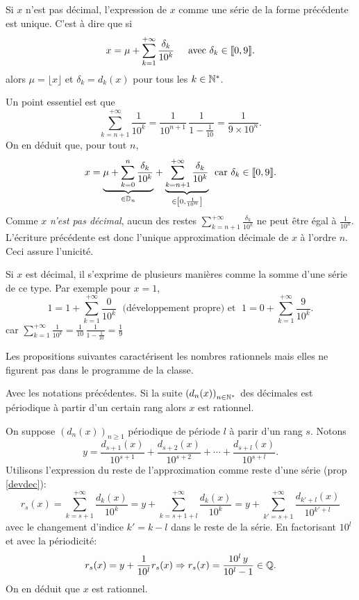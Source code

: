 \begin{propn}
 Si $x$ n'est pas décimal, l'expression de $x$ comme une série de la forme précédente est unique. C'est à dire que si
\[
 x = \mu + \sum_{k=1}^{+\infty} \frac{\delta_k}{10^k} \hspace{0.5cm} \text{avec } \delta_k \in \llbracket 0,9 \rrbracket.
\]
alors $\mu = \lfloor x \rfloor$ et $\delta_k = d_k(x)$ pour tous les $k \in \mathbb{N}^*$.
\end{propn}
\begin{demo}
Un point essentiel est que 
\[
\sum_{k=n+1}^{+\infty}\frac{1}{10^k} = \frac{1}{10^{n+1}}\,\frac{1}{1-\frac{1}{10}} = \frac{1}{9\times 10^n}.
\]
On en déduit que, pour tout $n$,
\[
 x = \underset{ \in \mathbb{D}_n}{\underbrace{\mu + \sum_{k=0}^{n}\frac{\delta_k}{10^k}}} 
 + \underset{ \in \left[ 0,\frac{1}{10^{n}}\right] }{\underbrace{\sum_{k=n+1}^{+\infty}\frac{\delta_k}{10^k}}}\; \text{ car } \delta_k \in \llbracket 0,9\rrbracket.
\]
Comme $x$ \emph{n'est pas décimal}, aucun des restes $\sum_{k=n+1}^{+\infty}\frac{\delta_k}{10^k}$ ne peut être égal à $\frac{1}{10^n}$. L'écriture précédente est donc l'unique approximation décimale de $x$ à l'ordre $n$. Ceci assure l'unicité.
\end{demo}
\begin{rem}
 Si $x$ est décimal, il s'exprime de plusieurs manières comme la somme d'une série de ce type. Par exemple pour $x=1$,
\[
 1 = 1 + \sum_{k=1}^{+\infty} \frac{0}{10^{k}} \;\text{ (développement propre) et } \; 1 = 0 + \sum_{k=1}^{+\infty} \frac{9}{10^{k}}.
\]
car $\sum_{k=1}^{+\infty} \frac{1}{10^{k}} = \frac{1}{10}\,\frac{1}{1 - \frac{1}{10}} = \frac{1}{9}$
\end{rem}
Les propositions suivantes caractérisent les nombres rationnels mais elles ne figurent pas dans le programme de la classe.
\begin{propn}
 Avec les notations précédentes. Si la suite $\left( d_n(x) \right)_{n \in \mathbb{N}^*}$ des décimales est périodique à partir d'un certain rang alors $x$ est rationnel. 
\end{propn}
\begin{demo}
 On suppose $\left( d_n(x) \right)_{n \geq 1}$ périodique de période $l$ à parir d'un rang $s$. Notons
\[
 y = \frac{d_{s+1}(x)}{10^{s+1}} + \frac{d_{s+2}(x)}{10^{s+2}} + \cdots + \frac{d_{s+l}(x)}{10^{s+l}}.  
\]
Utilisons l'expression du reste de l'approximation comme reste d'une série (prop \ref{devdec}):
\[
 r_{s}(x) = \sum_{k=s+1}^{+\infty}\frac{d_k(x)}{10^k}
 = y + \sum_{k=s+1+l}^{+\infty}\frac{d_k(x)}{10^k}
 = y + \sum_{k'= s+1}^{+\infty}\frac{d_{k'+l}(x)}{10^{k'+l}}
\]
avec le changement d'indice $k' = k - l$ dans le reste de la série. En factorisant $10^{l}$ et avec la périodicité:
\[
 r_s(x) = y + \frac{1}{10^l}r_s(x) \Rightarrow r_s(x) = \frac{10^l\,y}{10^l - 1} \in \mathbb{Q}.
\]
On en déduit que $x$ est rationnel. 
\end{demo}
